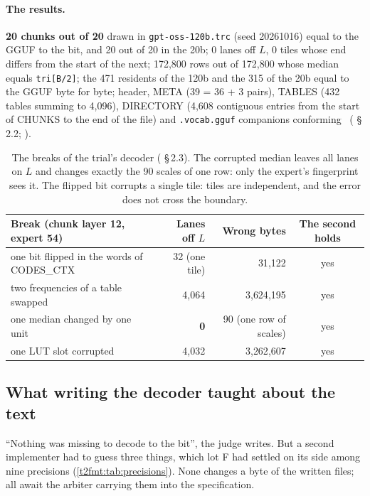 \paragraph{The results.} \textbf{20 chunks out of 20} drawn in \texttt{gpt-oss-120b.trc} (seed 20261016) equal to the GGUF to the bit, and 20 out of 20 in the 20b; 0 lanes off $L$, 0 tiles whose end differs from the start of the next; 172{,}800 rows out of 172{,}800 whose median equals \texttt{tri[B/2]}; the 471 residents of the 120b and the 315 of the 20b equal to the GGUF byte for byte; header, META (39 = 36 + 3 pairs), TABLES (432 tables summing to 4{,}096), DIRECTORY (4{,}608 contiguous entries from the start of CHUNKS to the end of the file) and \texttt{.vocab.gguf} companions conforming \mes~( §\,2.2; ).

\begin{table}[ht]
\centering\small
\begin{tabularx}{\linewidth}{>{\raggedright\arraybackslash}X r r c}
\toprule
Break (chunk layer 12, expert 54) & Lanes off $L$ & Wrong bytes & The second holds \\
\midrule
one bit flipped in the words of CODES\_CTX & 32 (one tile) & 31{,}122 & yes \\
two frequencies of a table swapped & 4{,}064 & 3{,}624{,}195 & yes \\
one median changed by one unit & \textbf{0} & 90 (one row of scales) & yes \\
one LUT slot corrupted & 4{,}032 & 3{,}262{,}607 & yes \\
\bottomrule
\end{tabularx}
\caption[The breaks of the trial's decoder]{The breaks of the trial's decoder ( §\,2.3). The corrupted median leaves all lanes on $L$ and changes exactly the 90 scales of one row: only the expert's fingerprint sees it. The flipped bit corrupts a single tile: tiles are independent, and the error does not cross the boundary.}
\label{t2fmt:tab:cassures-s4}
\end{table}

\subsection{What writing the decoder taught about the text}

``Nothing was missing to decode to the bit'', the judge writes. But a second implementer had to guess three things, which lot F had settled on its side among nine precisions (\cref{t2fmt:tab:precisions}). None changes a byte of the written files; all await the arbiter carrying them into the specification.

